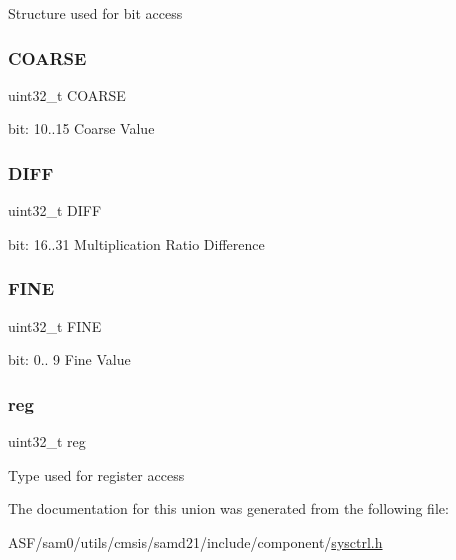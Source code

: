 Structure used for bit access \mbox{\label{union_s_y_s_c_t_r_l___d_f_l_l_v_a_l___type_a0e15a0b79112e107d20f1534dab23427}} 
\subsubsection{\texorpdfstring{COARSE}{COARSE}}
{\footnotesize\ttfamily uint32\+\_\+t C\+O\+A\+R\+SE}

bit\+: 10..15 Coarse Value \mbox{\label{union_s_y_s_c_t_r_l___d_f_l_l_v_a_l___type_ab78acedd49dbc152b1e08f615fafc97b}} 
\subsubsection{\texorpdfstring{DIFF}{DIFF}}
{\footnotesize\ttfamily uint32\+\_\+t D\+I\+FF}

bit\+: 16..31 Multiplication Ratio Difference \mbox{\label{union_s_y_s_c_t_r_l___d_f_l_l_v_a_l___type_a9ead7045e9abb8994d99b2be8e4aae27}} 
\subsubsection{\texorpdfstring{FINE}{FINE}}
{\footnotesize\ttfamily uint32\+\_\+t F\+I\+NE}

bit\+: 0.. 9 Fine Value \mbox{\label{union_s_y_s_c_t_r_l___d_f_l_l_v_a_l___type_a6b91636401516a477989a336376d7b40}} 
\subsubsection{\texorpdfstring{reg}{reg}}
{\footnotesize\ttfamily uint32\+\_\+t reg}

Type used for register access 

The documentation for this union was generated from the following file\+:\begin{DoxyCompactItemize}
\item 
A\+S\+F/sam0/utils/cmsis/samd21/include/component/\mbox{\hyperlink{component_2sysctrl_8h}{sysctrl.\+h}}\end{DoxyCompactItemize}

